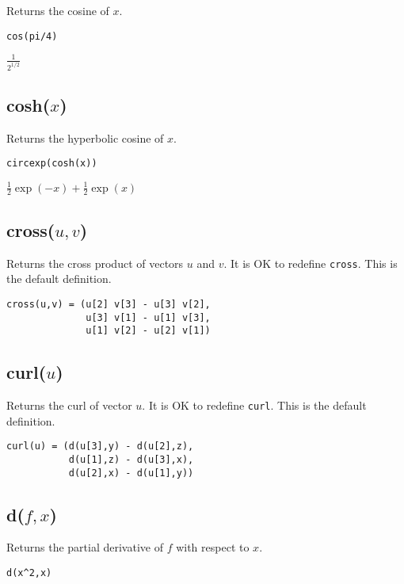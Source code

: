 Returns the cosine of $x$.

{\color{blue}
\begin{verbatim}
cos(pi/4)
\end{verbatim}
}

\noindent
$\displaystyle \frac{1}{2^{1/2}}$

\subsection*{cosh($x$)}

Returns the hyperbolic cosine of $x$.

{\color{blue}
\begin{verbatim}
circexp(cosh(x))
\end{verbatim}
}

\noindent
$\tfrac{1}{2}\exp(-x)+\tfrac{1}{2}\exp(x)$


\subsection*{cross($u,v$)}

Returns the cross product of vectors $u$ and $v$.
It is OK to redefine {\tt cross}.
This is the default definition.

{\color{blue}
\begin{verbatim}
cross(u,v) = (u[2] v[3] - u[3] v[2],
              u[3] v[1] - u[1] v[3],
              u[1] v[2] - u[2] v[1])
\end{verbatim}
}

\subsection*{curl($u$)}

Returns the curl of vector $u$.
It is OK to redefine {\tt curl}.
This is the default definition.

{\color{blue}
\begin{verbatim}
curl(u) = (d(u[3],y) - d(u[2],z),
           d(u[1],z) - d(u[3],x),
           d(u[2],x) - d(u[1],y))
\end{verbatim}
}

\subsection*{d($f,x$)}

Returns the partial derivative of $f$ with respect to $x$.

{\color{blue}
\begin{verbatim}
d(x^2,x)
\end{verbatim}
}

